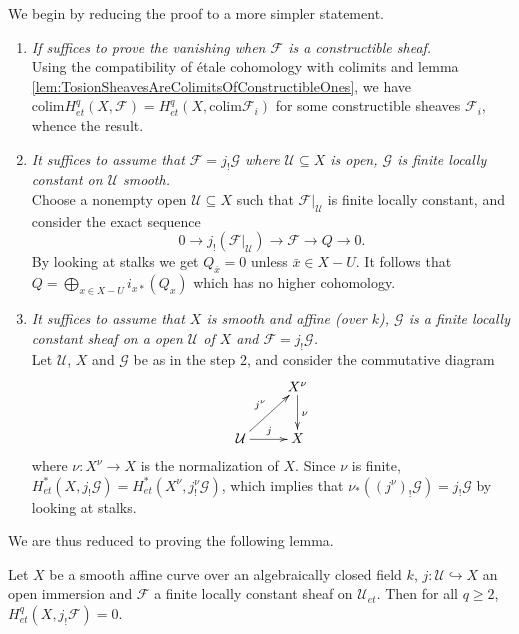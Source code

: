 We begin by reducing the proof to a more simpler statement.
\begin{enumerate}
\item
{\it If suffices to prove the vanishing when $\mathcal{F}$ is a constructible sheaf.}
\\
Using the compatibility of \'etale cohomology with colimits and lemma \ref{lem:TosionSheavesAreColimitsOfConstructibleOnes}, we have $\text{colim} H_{et}^q(X, \mathcal{F}) = H_{et}^q(X, \text{colim} \mathcal{F}_i)$ for some constructible sheaves $\mathcal{F}_i$, whence the result.
\item
{\it It suffices to assume that $\mathcal{F} = j_!\mathcal{G}$ where $\mathcal{U}\subseteq X$ is open, $\mathcal{G}$ is finite locally constant on $\mathcal{U}$ smooth.}
\\
Choose a nonempty open $\mathcal{U}\subseteq X$ such that $\mathcal{F}|_\mathcal{U}$ is finite locally constant, and consider the exact sequence
$$
0\to j_!(\mathcal{F}|_\mathcal{U})\to \mathcal{F}\to Q\to 0.
$$
By looking at stalks we get $Q_{\bar x}=0$ unless $\bar x\in X-U$. It follows that $\displaystyle Q = \bigoplus_{x\in X-U} i_{x*} (Q_x)$
which has no higher cohomology.
\item
{\it It suffices to assume that $X$ is smooth and affine (over $k$), $\mathcal{G}$ is a finite locally constant sheaf on a open $\mathcal{U}$ of $X$ and $\mathcal{F} = j_!\mathcal{G}$.}
\\
Let $\mathcal{U}$, $X$ and $\mathcal{G}$ be as in the step 2, and consider the commutative diagram
$$\xymatrix{
& {X^\nu} \ar^{\nu}[d]\\
{\mathcal{U}} \ar^{j}[r] \ar^{j^\nu}[ur] & {X}
} 
$$
where $\nu: X^\nu \to X$ is the normalization of $X$. Since $\nu$ is finite, $H_{et}^*(X, j_!\mathcal{G}) = H_{et}^*(X^\nu, j^\nu_!\mathcal{G})$, which implies that $\nu_*((j^\nu)_!\mathcal{G}) = j_!\mathcal{G}$ by looking at stalks. 
\end{enumerate}

We are thus reduced to proving the following lemma.

\begin{lemma} \label{lem:VanishingForSmoothAffineCurvesAndSimpleSheaves}
Let $X$ be a smooth affine curve over an algebraically closed field $k$, $j: \mathcal{U} \hookrightarrow X$ an open immersion and $\mathcal{F}$ a finite locally constant sheaf on $\mathcal{U}_{et}$. Then for all $q \geq 2$, $H_{et}^q(X, j_! \mathcal{F}) = 0$.
\end{lemma}

